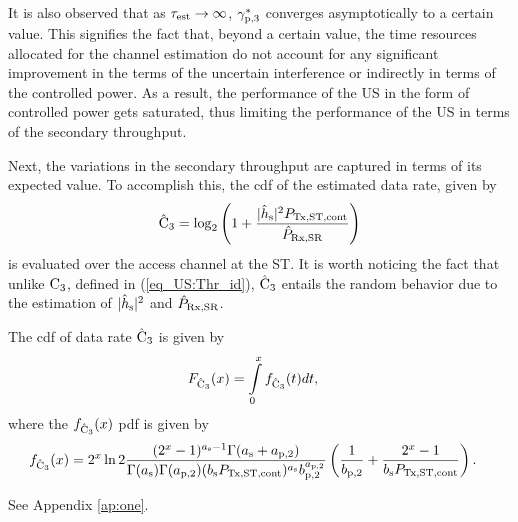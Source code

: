\begin{remark}
{It is also observed that as $\tau_{\text{est}} \rightarrow \infty$, ${\gamma}_{\text{p,3}}^*$ converges asymptotically to a certain value. This signifies the fact that, beyond a certain value, the time resources allocated for the channel estimation do not account for any significant improvement in the terms of the uncertain interference or indirectly in terms of the controlled power. As a result, the performance of the US in the form of controlled power gets saturated, thus limiting the performance of the US in terms of the secondary throughput.}  %
\end{remark}
Next, the variations in the secondary throughput are captured in terms of its expected value. To accomplish this, the cdf of the estimated data rate, given by%
\begin{align}
\hat{\text{{C}}}_{\text{3}}  = \log_2 \left(1 + \frac{|\hat{h}_{\text{s}}|^2 P_{\text{Tx,ST,cont}}}{\hat{P}_{\text{Rx,SR}}} \right) \label{eq_US:eca}
\end{align}
is evaluated over the access channel at the ST. It is worth noticing the fact that unlike $\text{C}_{\text{3}}$, defined in (\ref{eq_US:Thr_id}), $\hat{\text{{C}}}_{\text{3}}$ entails the random behavior due to the estimation of $|\hat{h}_{\text{s}}|^2$ and $\hat{P}_{\text{Rx,SR}}$.
\begin{lemma} \label{lm_US:lm5}
\normalfont 
The cdf of data rate $\hat{\text{{C}}}_{\text{3}}$ is given by
\begin{align}
F_{\hat{\text{{C}}}_{\text{3}}}(x) &= \int\limits_{0}^{x} f_{\hat{\text{{C}}}_{\text{3}}}(t) dt, \label{eq_US:dis_C} 
\end{align}
where the $f_{\hat{\text{{C}}}_{\text{3}}}(x)$ pdf is given by 
\begin{align}
f_{\hat{\text{{C}}}_{\text{3}}}(x) &= 2^x \ln 2 \frac{(2^x - 1)^{a_{\text{s}} - 1} \Gamma(a_{\text{s}} + a_{\text{p,2}})}{\Gamma(a_{\text{s}}) \Gamma(a_{\text{p,2}}) (b_{\text{s}} P_{\text{Tx,ST,cont}}) ^{a_{\text{s}}} b_{\text{p,2}}^{a_{\text{p,2}}}} \left(\frac{1}{b_{\text{p,2}}} + \frac{2^x - 1}{b_{\text{s}} P_{\text{Tx,ST,cont}}}\right). \label{eq_US:den_C}
\end{align}
\end{lemma}
\begin{IEEEproof}[Solution]
See Appendix \ref{ap:one}.
\end{IEEEproof}

